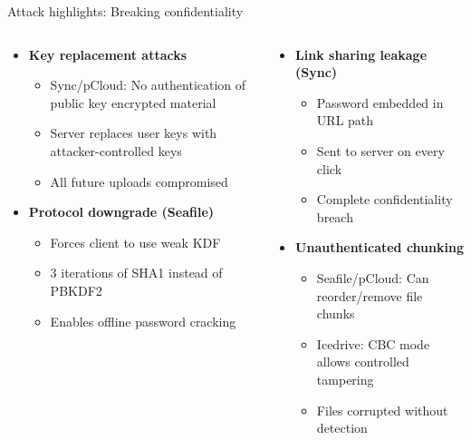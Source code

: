 \documentclass[aspectratio=169, lualatex, handout]{beamer}
\begin{document}
\begin{frame}{Attack highlights: Breaking confidentiality}
	\begin{columns}[c]
		\begin{column}{0.5\textwidth}
			\begin{itemize}
				\item \textbf{Key replacement attacks}
				      \begin{itemize}
					      \item Sync/pCloud: No authentication of public key encrypted material
					      \item Server replaces user keys with attacker-controlled keys
					      \item All future uploads compromised
				      \end{itemize}
			\end{itemize}
			\vspace{0.3cm}
			\begin{itemize}
				\item \textbf{Protocol downgrade (Seafile)}
				      \begin{itemize}
					      \item Forces client to use weak KDF
					      \item 3 iterations of SHA1 instead of PBKDF2
					      \item Enables offline password cracking
				      \end{itemize}
			\end{itemize}
		\end{column}
		\begin{column}{0.5\textwidth}
			\begin{itemize}
				\item \textbf{Link sharing leakage (Sync)}
				      \begin{itemize}
					      \item Password embedded in URL path
					      \item Sent to server on every click
					      \item Complete confidentiality breach
				      \end{itemize}
			\end{itemize}
			\vspace{0.3cm}
			\begin{itemize}
				\item \textbf{Unauthenticated chunking}
				      \begin{itemize}
					      \item Seafile/pCloud: Can reorder/remove file chunks
					      \item Icedrive: CBC mode allows controlled tampering
					      \item Files corrupted without detection
				      \end{itemize}
			\end{itemize}
		\end{column}
	\end{columns}
\end{frame}
\end{document}
